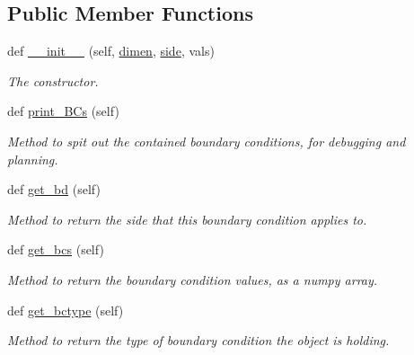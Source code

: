\subsection*{Public Member Functions}
\begin{DoxyCompactItemize}
\item 
def \hyperlink{classMain__PDE__Repo_1_1src_1_1static__bcs_1_1StaticBCs_a9231c3b0dd3e4263e453d0ba4211dee3}{\+\_\+\+\_\+init\+\_\+\+\_\+} (self, \hyperlink{classMain__PDE__Repo_1_1src_1_1static__bcs_1_1StaticBCs_ad2f589646d3cbb6c43747d26802ca239}{dimen}, \hyperlink{classMain__PDE__Repo_1_1src_1_1static__bcs_1_1StaticBCs_a4f88c825d9bf611f48678b0d606e24e2}{side}, vals)
\begin{DoxyCompactList}\small\item\em The constructor. \end{DoxyCompactList}\item 
def \hyperlink{classMain__PDE__Repo_1_1src_1_1static__bcs_1_1StaticBCs_a46906776d8eb2c4e773b946dd92c4eb8}{print\+\_\+\+B\+Cs} (self)
\begin{DoxyCompactList}\small\item\em Method to spit out the contained boundary conditions, for debugging and planning. \end{DoxyCompactList}\item 
def \hyperlink{classMain__PDE__Repo_1_1src_1_1static__bcs_1_1StaticBCs_a33fc3207e1d39ce2970660ccd31d4084}{get\+\_\+bd} (self)
\begin{DoxyCompactList}\small\item\em Method to return the side that this boundary condition applies to. \end{DoxyCompactList}\item 
def \hyperlink{classMain__PDE__Repo_1_1src_1_1static__bcs_1_1StaticBCs_a12e20f5473740c1a93f3516d64b619fb}{get\+\_\+bcs} (self)
\begin{DoxyCompactList}\small\item\em Method to return the boundary condition values, as a numpy array. \end{DoxyCompactList}\item 
def \hyperlink{classMain__PDE__Repo_1_1src_1_1static__bcs_1_1StaticBCs_a3844f290b44196915bdf036afbcda8a8}{get\+\_\+bctype} (self)
\begin{DoxyCompactList}\small\item\em Method to return the type of boundary condition the object is holding. \end{DoxyCompactList}\end{DoxyCompactItemize}
